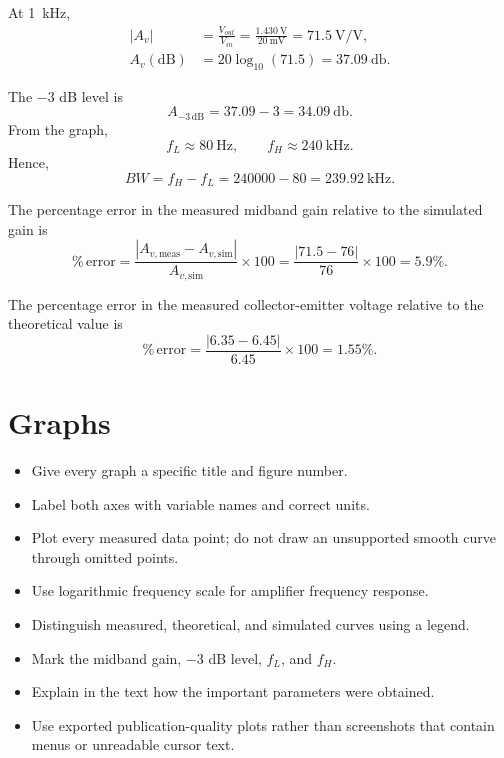 \documentclass[11pt,a4paper]{article}
\newcommand{\pcterror}{\%\,\text{error}}
\begin{document}
\begin{examplebox}
At \SI{1}{\kilo\hertz},
\begin{align}
|A_v|
&=\frac{V_{out}}{V_{in}}
=\frac{\SI{1.430}{\volt}}{\SI{20}{\milli\volt}}
=\SI{71.5}{\volt\per\volt},\\
A_v(\mathrm{dB})
&=20\log_{10}(71.5)
=\SI{37.09}{\decibel}.
\end{align}

The $-3$ dB level is
\begin{equation}
A_{-3\,\mathrm{dB}}
=37.09-3
=\SI{34.09}{\decibel}.
\end{equation}
From the graph,
\[
f_L\approx\SI{80}{\hertz},
\qquad
f_H\approx\SI{240}{\kilo\hertz}.
\]
Hence,
\begin{equation}
BW=f_H-f_L
=240000-80
=\SI{239.92}{\kilo\hertz}.
\end{equation}

The percentage error in the measured midband gain relative to the simulated
gain is
\begin{equation}
\pcterror
=
\frac{|A_{v,\mathrm{meas}}-A_{v,\mathrm{sim}}|}
{A_{v,\mathrm{sim}}}\times100
=
\frac{|71.5-76|}{76}\times100
=5.9\%.
\end{equation}

The percentage error in the measured collector-emitter voltage relative to
the theoretical value is
\begin{equation}
\pcterror
=
\frac{|6.35-6.45|}{6.45}\times100
=1.55\%.
\end{equation}
\end{examplebox}

\section{Graphs}
\begin{sectionguide}
\begin{itemize}
  \item Give every graph a specific title and figure number.
  \item Label both axes with variable names and correct units.
  \item Plot every measured data point; do not draw an unsupported smooth
        curve through omitted points.
  \item Use logarithmic frequency scale for amplifier frequency response.
  \item Distinguish measured, theoretical, and simulated curves using a
        legend.
  \item Mark the midband gain, $-3$ dB level, $f_L$, and $f_H$.
  \item Explain in the text how the important parameters were obtained.
  \item Use exported publication-quality plots rather than screenshots that
        contain menus or unreadable cursor text.
\end{itemize}
\end{sectionguide}
\end{document}
